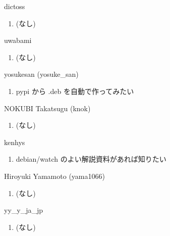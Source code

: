 \begin{prework}{ dictoss }
  \begin{enumerate}
  \item (なし)
  \end{enumerate}
\end{prework}

\begin{prework}{ uwabami }
  \begin{enumerate}
  \item (なし)
  \end{enumerate}
\end{prework}

\begin{prework}{ yosukesan (yosuke\_san) }
  \begin{enumerate}
  \item pypi から .deb を自動で作ってみたい
  \end{enumerate}
\end{prework}

\begin{prework}{ NOKUBI Takatsugu (knok) }
  \begin{enumerate}
  \item (なし)
  \end{enumerate}
\end{prework}

\begin{prework}{ kenhys }
  \begin{enumerate}
  \item debian/watch のよい解説資料があれば知りたい
  \end{enumerate}
\end{prework}

\begin{prework}{ Hiroyuki Yamamoto (yama1066) }
  \begin{enumerate}
  \item (なし)
  \end{enumerate}
\end{prework}

\begin{prework}{ yy\_y\_ja\_jp }
  \begin{enumerate}
  \item (なし)
  \end{enumerate}
\end{prework}
